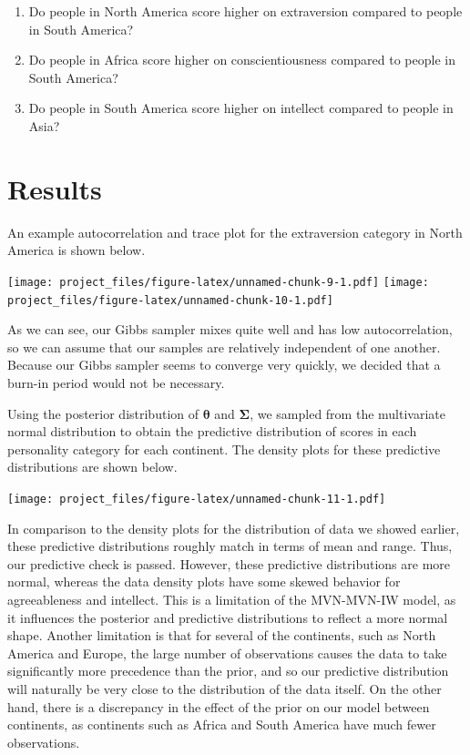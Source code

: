 \documentclass[
]{article}
\providecommand{\tightlist}{%
  \setlength{\itemsep}{0pt}\setlength{\parskip}{0pt}}
\begin{document}
\begin{enumerate}
\def\labelenumi{\arabic{enumi}.}
\tightlist
\item
  Do people in North America score higher on extraversion compared to
  people in South America?
\item
  Do people in Africa score higher on conscientiousness compared to
  people in South America?
\item
  Do people in South America score higher on intellect compared to
  people in Asia?
\end{enumerate}

\hypertarget{results}{%
\section{Results}\label{results}}

An example autocorrelation and trace plot for the extraversion category
in North America is shown below.

\texttt{[image: project\_files/figure-latex/unnamed-chunk-9-1.pdf]}
\texttt{[image: project\_files/figure-latex/unnamed-chunk-10-1.pdf]}

As we can see, our Gibbs sampler mixes quite well and has low
autocorrelation, so we can assume that our samples are relatively
independent of one another. Because our Gibbs sampler seems to converge
very quickly, we decided that a burn-in period would not be necessary.

Using the posterior distribution of \(\boldsymbol \theta\) and
\(\mathbf \Sigma\), we sampled from the multivariate normal distribution
to obtain the predictive distribution of scores in each personality
category for each continent. The density plots for these predictive
distributions are shown below.

\texttt{[image: project\_files/figure-latex/unnamed-chunk-11-1.pdf]}

In comparison to the density plots for the distribution of data we
showed earlier, these predictive distributions roughly match in terms of
mean and range. Thus, our predictive check is passed. However, these
predictive distributions are more normal, whereas the data density plots
have some skewed behavior for agreeableness and intellect. This is a
limitation of the MVN-MVN-IW model, as it influences the posterior and
predictive distributions to reflect a more normal shape. Another
limitation is that for several of the continents, such as North America
and Europe, the large number of observations causes the data to take
significantly more precedence than the prior, and so our predictive
distribution will naturally be very close to the distribution of the
data itself. On the other hand, there is a discrepancy in the effect of
the prior on our model between continents, as continents such as Africa
and South America have much fewer observations.
\end{document}

